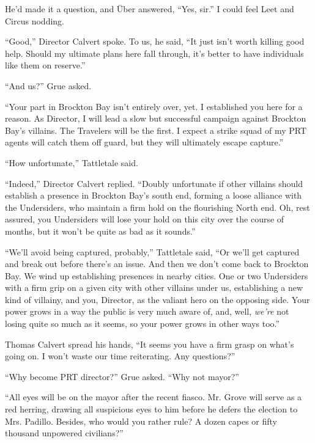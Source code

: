 He'd made it a question, and \"{U}ber answered, ``Yes, sir.''  I could feel Leet and Circus nodding.



``Good,'' Director Calvert spoke.  To us, he said, ``It just isn't worth killing good help.  Should my ultimate plans here fall through, it's better to have individuals like them on reserve.''



``And us?'' Grue asked.



``Your part in Brockton Bay isn't entirely over, yet.  I established you here for a reason.  As Director, I will lead a slow but successful campaign against Brockton Bay's villains.  The Travelers will be the first.  I expect a strike squad of my PRT agents will catch them off guard, but they will ultimately escape capture.''



``How unfortunate,'' Tattletale said.



``Indeed,'' Director Calvert replied.  ``Doubly unfortunate if other villains should establish a presence in Brockton Bay's south end, forming a loose alliance with the Undersiders, who maintain a firm hold on the flourishing North end.  Oh, rest assured, you Undersiders will lose your hold on this city over the course of months, but it won't be quite as bad as it sounds.''



``We'll avoid being captured, probably,'' Tattletale said, ``Or we'll get captured and break out before there's an issue.  And then we don't come back to Brockton Bay.  We wind up establishing presences in nearby cities.  One or two Undersiders with a firm grip on a given city with other villains under us, establishing a new kind of villainy, and you, Director, as the valiant hero on the opposing side.  Your power grows in a way the public is very much aware of, and, well, \emph{we're} not losing quite so much as it seems, so your power grows in other ways too.''



Thomas Calvert spread his hands, ``It seems you have a firm grasp on what's going on.  I won't waste our time reiterating.  Any questions?''



``Why become PRT director?'' Grue asked.  ``Why not mayor?''



``All eyes will be on the mayor after the recent fiasco.  Mr. Grove will serve as a red herring, drawing all suspicious eyes to him before he defers the election to Mrs. Padillo.  Besides, who would you rather rule?  A dozen capes or fifty thousand unpowered civilians?''



